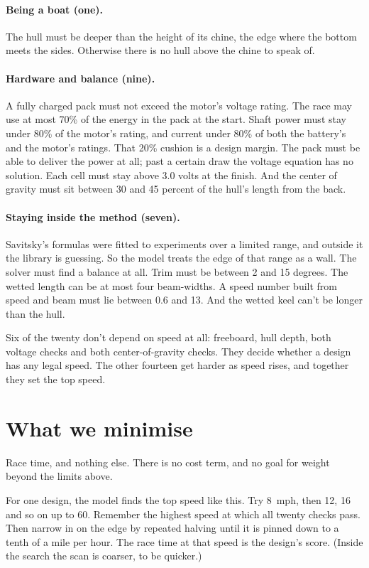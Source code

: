 \documentclass[11pt,a4paper]{article}
\renewcommand{\_}{\textunderscore\allowbreak}
\begin{document}
\paragraph{Being a boat (one).} The hull must be deeper than the height of its chine, the edge where the bottom meets the sides. Otherwise there is no hull above the chine to speak of.

\paragraph{Hardware and balance (nine).} A fully charged pack must not exceed the motor's voltage rating. The race may use at most 70\% of the energy in the pack at the start. Shaft power must stay under 80\% of the motor's rating,
and current under 80\% of both the battery's and the motor's ratings. That 20\% cushion is a design margin. The pack must be able to deliver the power at all; past a certain draw the voltage equation has no solution.
Each cell must stay above 3.0 volts at the finish. And the center of gravity must sit between 30 and 45 percent of the hull's length from the back.

\paragraph{Staying inside the method (seven).} Savitsky's formulas were fitted to experiments over a limited range, and outside it the library is guessing. So the model treats the edge of that range as a wall.
The solver must find a balance at all. Trim must be between 2 and 15 degrees. The wetted length can be at most four beam-widths. A speed number built from speed and beam must lie between 0.6 and 13.
And the wetted keel can't be longer than the hull.

Six of the twenty don't depend on speed at all: freeboard, hull depth, both voltage checks and both center-of-gravity checks. They decide whether a design has any legal speed.
The other fourteen get harder as speed rises, and together they set the top speed.

\section*{What we minimise}
\label{sec:objective}

Race time, and nothing else. There is no cost term, and no goal for weight beyond the limits above.

For one design, the model finds the top speed like this. Try 8~mph, then 12, 16 and so on up to 60. Remember the highest speed at which all twenty checks pass. Then narrow in on the edge by repeated halving
until it is pinned down to a tenth of a mile per hour. The race time at that speed is the design's score. (Inside the search the scan is coarser, to be quicker.)
\end{document}
